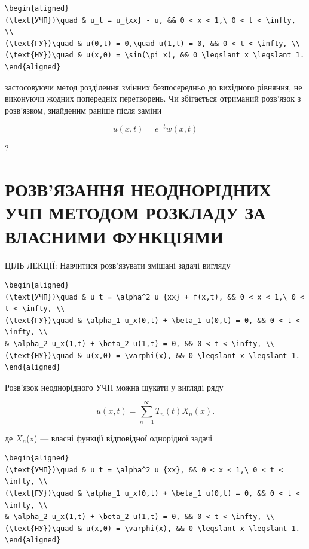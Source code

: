\documentclass[
  ukrainian,
]{article}
\begin{document}
\begin{verbatim}
\begin{aligned}
(\text{УЧП})\quad & u_t = u_{xx} - u, && 0 < x < 1,\ 0 < t < \infty, \\
(\text{ГУ})\quad & u(0,t) = 0,\quad u(1,t) = 0, && 0 < t < \infty, \\
(\text{НУ})\quad & u(x,0) = \sin(\pi x), && 0 \leqslant x \leqslant 1.
\end{aligned}
\end{verbatim}

застосовуючи метод розділення змінних безпосередньо до вихідного
рівняння, не виконуючи жодних попередніх перетворень. Чи збігається
отриманий розв'язок з розв'язком, знайденим раніше після заміни

\[
u(x,t) = e^{-t}w(x,t)
\]

?

\section{РОЗВ'ЯЗАННЯ НЕОДНОРІДНИХ УЧП МЕТОДОМ РОЗКЛАДУ ЗА ВЛАСНИМИ
ФУНКЦІЯМИ}\label{ux440ux43eux437ux432ux44fux437ux430ux43dux43dux44f-ux43dux435ux43eux434ux43dux43eux440ux456ux434ux43dux438ux445-ux443ux447ux43f-ux43cux435ux442ux43eux434ux43eux43c-ux440ux43eux437ux43aux43bux430ux434ux443-ux437ux430-ux432ux43bux430ux441ux43dux438ux43cux438-ux444ux443ux43dux43aux446ux456ux44fux43cux438}

ЦІЛЬ ЛЕКЦІЇ: Навчитися розв'язувати змішані задачі вигляду

\begin{verbatim}
\begin{aligned}
(\text{УЧП})\quad & u_t = \alpha^2 u_{xx} + f(x,t), && 0 < x < 1,\ 0 < t < \infty, \\
(\text{ГУ})\quad & \alpha_1 u_x(0,t) + \beta_1 u(0,t) = 0, && 0 < t < \infty, \\
& \alpha_2 u_x(1,t) + \beta_2 u(1,t) = 0, && 0 < t < \infty, \\
(\text{НУ})\quad & u(x,0) = \varphi(x), && 0 \leqslant x \leqslant 1.
\end{aligned}
\end{verbatim}

Розв'язок неоднорідного УЧП можна шукати у вигляді ряду

\[
u(x,t) = \sum_{n=1}^{\infty} T_n(t) X_n(x).
\]

де \(X_n\)(x) --- власні функції відповідної однорідної задачі

\begin{verbatim}
\begin{aligned}
(\text{УЧП})\quad & u_t = \alpha^2 u_{xx}, && 0 < x < 1,\ 0 < t < \infty, \\
(\text{ГУ})\quad & \alpha_1 u_x(0,t) + \beta_1 u(0,t) = 0, && 0 < t < \infty, \\
& \alpha_2 u_x(1,t) + \beta_2 u(1,t) = 0, && 0 < t < \infty, \\
(\text{НУ})\quad & u(x,0) = \varphi(x), && 0 \leqslant x \leqslant 1.
\end{aligned}
\end{verbatim}
\end{document}
